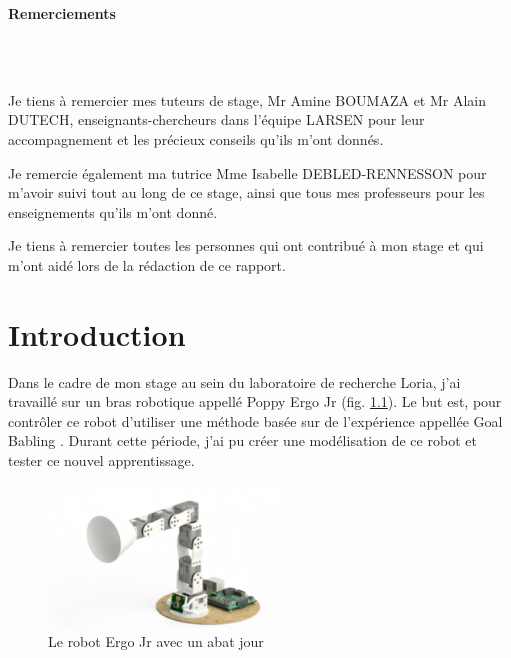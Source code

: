 \documentclass[11pt,french]{report}
\begin{document}
\noindent\textbf{\Huge Remerciements}

\phantom{INVISIBLE LINE}\\
\phantom{INVISIBLE LINE}\\
\phantom{INVISIBLE LINE}

Je tiens à remercier mes tuteurs de stage, Mr Amine BOUMAZA et Mr Alain DUTECH, enseignants-chercheurs dans l'équipe LARSEN pour leur accompagnement et les précieux conseils qu'ils m'ont donnés.

\phantom{INVISIBLE LINE}

Je remercie également ma tutrice Mme Isabelle DEBLED-RENNESSON pour m'avoir suivi tout au long de ce stage, ainsi que tous mes professeurs pour les enseignements qu'ils m'ont donné.

\phantom{INVISIBLE LINE}

Je tiens à remercier toutes les personnes qui ont contribué à mon stage et qui m'ont aidé lors de la rédaction de ce rapport.

\tableofcontents


\chapter{Introduction}

Dans le cadre de mon stage au sein du laboratoire de recherche Loria, j'ai travaillé sur un bras robotique appellé Poppy Ergo Jr \cite{PoppyErgoJr} (fig. \ref{fig:ErgoJr}).
Le but est, pour contrôler ce robot d'utiliser une méthode basée sur de l'expérience appellée Goal Babling \cite{GoalBabling}.
Durant cette période, j'ai pu créer une modélisation de ce robot et tester ce nouvel apprentissage.

\phantom{INVISIBLE LINE}

\begin{figure}
    \centering
    \includegraphics[width=178pt]{Ergo_Jr_abat_jour} 
    \caption{Le robot Ergo Jr avec un abat jour}
    \label{fig:ErgoJr}
\end{figure}
\end{document}
